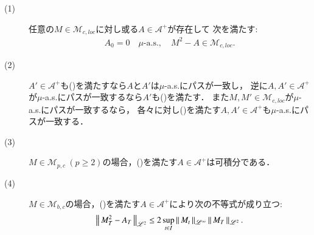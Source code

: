 	\begin{screen}
		\begin{thm}[二次変分の存在]\mbox{}
			\begin{description}
				\item[(1)]
					任意の$M \in \mathcal{M}_{c,loc}$に対し或る$A \in \mathcal{A}^+$が存在して
					次を満たす:
					\begin{align}
						A_0 = 0\quad \mbox{$\mu$-a.s.},
						\quad M^2 - A \in \mathcal{M}_{c,loc}.
						\label{eq:thm_existence_of_quadratic_variation_0}
					\end{align}
				\item[(2)]
					$A' \in \mathcal{A}^+$も()を満たすなら$A$と$A'$は$\mu$-a.s.にパスが一致し，
					逆に$A,A' \in \mathcal{A}^+$が$\mu$-a.s.にパスが一致するなら$A'$も()を満たす．
					また$M,M' \in \mathcal{M}_{c,loc}$が$\mu$-a.s.にパスが一致するなら，
					各々に対し()を満たす$A,A' \in \mathcal{A}^+$も$\mu$-a.s.にパスが一致する．
				\item[(3)]
					$M \in \mathcal{M}_{p,c}\ (p \geq 2)$の場合，()を満たす$A \in \mathcal{A}^+$は可積分である．
				
				\item[(4)]
					$M \in \mathcal{M}_{b,c}$の場合，()を満たす$A \in \mathcal{A}^+$により次の不等式が成り立つ:
					\begin{align}
						\left\|\, M_T^2 - A_T\, \right\|_{\mathscr{L}^2} \leq 2 \operatorname*{sup}_{t \in I} \left\|\, M_t\, \right\|_{\mathscr{L}^\infty} \left\|\, M_T\, \right\|_{\mathscr{L}^2}.
					\end{align}
			\end{description}
			\label{thm:existence_of_quadratic_variation}
		\end{thm}
	\end{screen}
	
